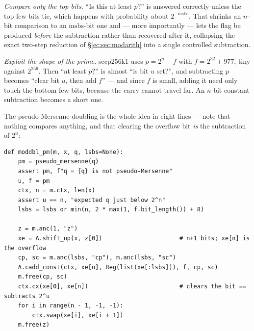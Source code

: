\documentclass[11pt]{article}
\theoremstyle{plain}
\theoremstyle{remark}
\begin{document}
\emph{Compare only the top bits.} ``Is this at least $p$?'' is answered correctly unless the top
few bits tie, which happens with probability about $2^{-\mathrm{msbs}}$. That shrinks an $n$-bit
comparison to an $\mathrm{msbs}$-bit one and --- more importantly --- lets the flag be produced
\emph{before} the subtraction rather than recovered after it, collapsing the exact two-step
reduction of \S\ref{ec:sec:modarith} into a single controlled subtraction.

\emph{Exploit the shape of the prime.} secp256k1 uses $p=2^{u}-f$ with $f=2^{32}+977$, tiny against
$2^{256}$. Then ``at least $p$?'' is almost ``is bit $u$ set?'', and subtracting $p$ becomes ``clear
bit $u$, then add $f$'' --- and since $f$ is small, adding it need only touch the bottom few bits,
because the carry cannot travel far. An $n$-bit constant subtraction becomes a short one.

The pseudo-Mersenne doubling is the whole idea in eight lines --- note that nothing compares
anything, and that clearing the overflow bit \emph{is} the subtraction of $2^u$:

\begin{lstlisting}
def moddbl_pm(m, x, q, lsbs=None):
    pm = pseudo_mersenne(q)
    assert pm, f"q = {q} is not pseudo-Mersenne"
    u, f = pm
    ctx, n = m.ctx, len(x)
    assert u == n, "expected q just below 2^n"
    lsbs = lsbs or min(n, 2 * max(1, f.bit_length()) + 8)

    z = m.anc(1, "z")
    xe = A.shift_up(x, z[0])                      # n+1 bits; xe[n] is the overflow
    cp, sc = m.anc(lsbs, "cp"), m.anc(lsbs, "sc")
    A.cadd_const(ctx, xe[n], Reg(list(xe[:lsbs])), f, cp, sc)
    m.free(cp, sc)
    ctx.cx(xe[0], xe[n])                          # clears the bit == subtracts 2^u
    for i in range(n - 1, -1, -1):
        ctx.swap(xe[i], xe[i + 1])
    m.free(z)
\end{lstlisting}
\end{document}
